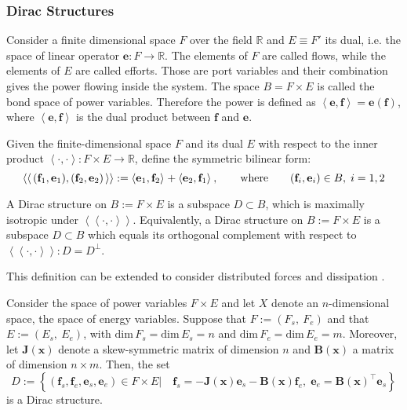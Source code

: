 \subsubsection{Dirac Structures}
Consider a  finite dimensional space ${F}$ over the field $\mathbb{R}$ and ${E} \equiv {F}'$ its dual, i.e. the space of linear operator $\mathbf{e} : {F} \rightarrow \mathbb{R}$. The elements of $\mathit{F}$ are called flows, while the elements of ${E}$ are called efforts. Those are port variables and their combination gives the power flowing inside the system. The space ${B} = {F} \times {E}$ is called the bond space of power variables. Therefore the power is defined as  $\left\langle \mathbf{e}, \mathbf{f} \right\rangle = \bm{e}(\mathbf{f})$, where $\left\langle \mathbf{e} , \mathbf{f} \right\rangle$ is the dual product between $\mathbf{f}$ and $\mathbf{e}$.
\begin{definition}
	Given the finite-dimensional space ${F}$ and its dual ${E}$ with respect to the inner product $\left\langle \cdot , \cdot \right\rangle : {F} \times {E} \rightarrow \mathbb{R}$, define the symmetric bilinear form:
	\begin{equation}
	\left\langle \left\langle \, (\mathbf{f}_1, \mathbf{e}_1), (\mathbf{f}_2, \mathbf{e}_2) \, \right\rangle \right\rangle := \left\langle \mathbf{e}_1, \mathbf{f}_2 \right\rangle_{} +  \left\langle \mathbf{e}_2, \mathbf{f}_1 \right\rangle_{}, \qquad \text{where} \qquad (\mathbf{f}_i, \mathbf{e}_i) \in {B}, \; i = 1, 2
	\end{equation}
	
	A Dirac structure on ${B} := {F} \times {E}$ is a subspace ${D} \subset {B}$, which is maximally isotropic under $\left\langle \left\langle \cdot, \cdot \right\rangle \right\rangle$.	Equivalently, a Dirac structure on ${B} := {F} \times {E}$ is a subspace ${D} \subset {B}$ 	which equals its orthogonal complement with respect to $\left\langle \left\langle \cdot, \cdot \right\rangle \right\rangle: {D} ={D}^\perp$.
\end{definition}
This definition can be extended to consider distributed forces and dissipation \cite{villegas2007}.
\begin{proposition}
	\label{prop:Dirac}
	Consider the space of power variables ${F} \times {E}$ and let ${X}$ denote an $n$-dimensional space, the space of energy variables. Suppose that ${F} := ({F}_s, \ {F}_e )$ and that ${E} := ({E}_s,  \ {E}_e )$, with $\text{dim} \, {F}_s = \text{dim} \, {E}_s = n$ and $\text{dim} \, {F}_e = \text{dim} \, {E}_e = m$. Moreover, let $\mathbf{J}(\mathbf{x})$ denote
	a skew-symmetric matrix of dimension $n$ and $\mathbf{B}(\mathbf{x})$ a matrix of dimension $n \times m$. Then, the set
	\begin{equation}
	{D} := \left\{ (\mathbf{f}_s, \mathbf{f}_e , \mathbf{e}_s ,\mathbf{e}_e ) \in {F} \times {E} \vert \quad \mathbf{f}_s = - \mathbf{J}(\mathbf{x}) \mathbf{e}_s - \mathbf{B}(\mathbf{x}) \mathbf{f}_e, \; \mathbf{e}_e = \mathbf{B}(\mathbf{x})^\top \mathbf{e}_s \right\}
	\end{equation}
	is a Dirac structure.
\end{proposition}

